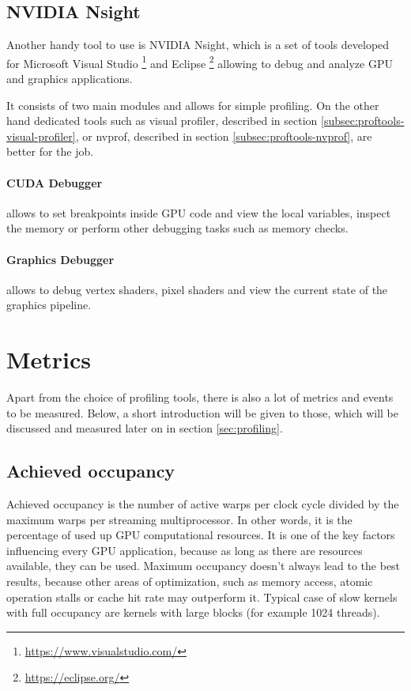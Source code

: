 \subsection{NVIDIA Nsight}\label{subsec:proftools-nsight}

Another handy tool to use is NVIDIA Nsight, which is a set of tools developed for Microsoft Visual Studio \footnote{\url{https://www.visualstudio.com/}} and Eclipse \footnote{\url{https://eclipse.org/}} allowing to debug and analyze GPU and graphics applications.

It consists of two main modules and allows for simple profiling. On the other hand dedicated tools such as visual profiler, described in section \ref{subsec:proftools-visual-profiler}, or nvprof, described in section \ref{subsec:proftools-nvprof}, are better for the job.

\paragraph{CUDA Debugger} allows to set breakpoints inside GPU code and view the local variables, inspect the memory or perform other debugging tasks such as memory checks.

\paragraph{Graphics Debugger} allows to debug vertex shaders, pixel shaders and view the current state of the graphics pipeline.

\section{Metrics}\label{sec:metrics}

Apart from the choice of profiling tools, there is also a lot of metrics and events to be measured. Below, a short introduction will be given to those, which will be discussed and measured later on in section \ref{sec:profiling}.

\subsection{Achieved occupancy}\label{subsec:metrics-achieved-occupancy}

Achieved occupancy is the number of active warps per clock cycle divided by the maximum warps per streaming multiprocessor. In other words, it is the percentage of used up GPU computational resources. It is one of the key factors influencing every GPU application, because as long as there are resources available, they can be used. Maximum occupancy doesn't always lead to the best results, because other areas of optimization, such as memory access, atomic operation stalls or cache hit rate may outperform it. Typical case of slow kernels with full occupancy are kernels with large blocks (for example 1024 threads).

